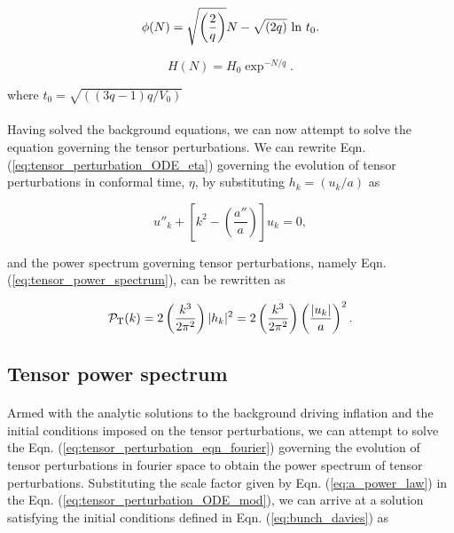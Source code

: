 \documentclass[12pt,a4paper,oneside]{book}
\begin{document}
\begin{equation}
\phi(N) = \sqrt{\left(\frac{2}{q}\right)} N 
- \sqrt{\left(2q\right)}~{\rm ln}~t_0.
\end{equation}

\begin{equation}
H(N) = H_0\exp^{-N/q}.
\end{equation}

\noindent where $t_0 = \sqrt{\left((3q-1)q/V_0\right)}$


\paragraph*{} Having solved the background equations, we can now 
attempt to solve the equation governing the tensor perturbations. We can 
rewrite Eqn. (\ref{eq:tensor_perturbation_ODE_eta}) governing the evolution 
of tensor perturbations in conformal time, $\eta$, by substituting 
$h_k = \left(u_k/a\right)$ as

\begin{equation}\label{eq:tensor_perturbation_ODE_mod}
u''_k + \left[k^2 - \left(\frac{a''}{a}\right)\right]u_k = 0,
\end{equation}

\noindent and the power spectrum governing tensor perturbations, namely 
Eqn. (\ref{eq:tensor_power_spectrum}), can be rewritten as

\begin{equation}
{\mathcal{P}}_{\rm T}(k) = 2 \left(\frac{k^3}{2\pi^2}\right) |h_k|^2 
= 2 \left(\frac{k^3}{2\pi^2}\right) \left(\frac{|u_k|}{a}\right)^2.
\end{equation}

\subsection{Tensor power spectrum}

\paragraph*{} Armed with the analytic solutions to the background driving 
inflation and the initial conditions imposed on the tensor perturbations, we 
can attempt to solve the Eqn. (\ref{eq:tensor_perturbation_eqn_fourier}) 
governing the evolution of tensor perturbations in fourier space to obtain 
the power spectrum of tensor perturbations. 
Substituting the scale factor given by Eqn. (\ref{eq:a_power_law}) 
in the Eqn. (\ref{eq:tensor_perturbation_ODE_mod}), we can arrive at a solution 
satisfying the initial conditions defined in Eqn. (\ref{eq:bunch_davies}) as 
\end{document}
